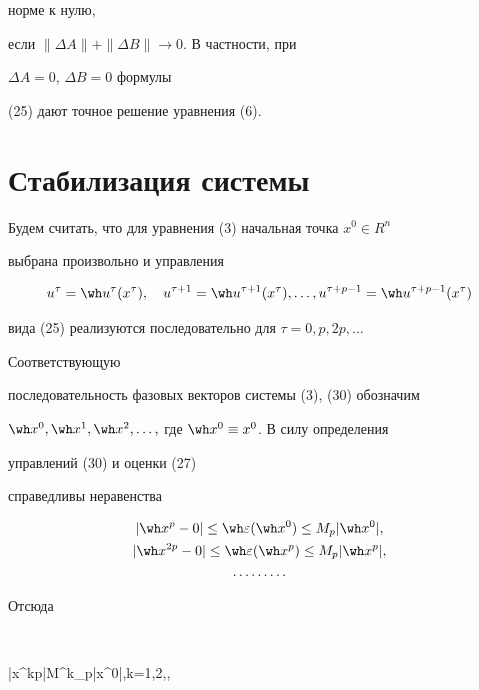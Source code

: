 норме к нулю, 


если $\|\Delta A\|+\|\Delta B\|\to 0$. В частности, при 


$\Delta A=0$, $\Delta B=0$ формулы 


(25) дают точное решение уравнения (6). 


 


 


\section{Стабилизация системы} 


 


Будем считать, что для уравнения (3) начальная точка $x^0\in R^n$ 


выбрана произвольно и управления 


\begin{equation} 


u^\tau=\wh u^\tau(x^\tau),\quad u^{\tau+1}=\wh u^{\tau+1}(x^\tau),\dotsc, 


u^{\tau+p-1}=\wh u^{\tau+p-1}(x^\tau) 


\end{equation} 


вида (25) реализуются последовательно для $\tau=0,p,2p,\dotsc$ 


Соответствующую 


последовательность фазовых векторов системы (3), (30) обозначим 


$\wh x^0,\wh x^1,\wh x^2,\dotsc,$ где $\wh x^0\equiv x^0$. В силу определения 


управлений (30) и оценки (27) 


справедливы неравенства 


\begin{gather*} 


|\wh x^p-0|\le\wh\varepsilon(\wh x^0)\le M_p|\wh x^0|,\\ 


|\wh x^{2p}-0|\le\wh\varepsilon(\wh x^p)\le M_p|\wh x^p|,\\ 


\dotsc\dotsc\dotsc 


\end{gather*} 


Отсюда 


$$ 


|\wh x^{kp}|\le M^k_p|x^0|,\quad k=1,2,\dotsc, 


